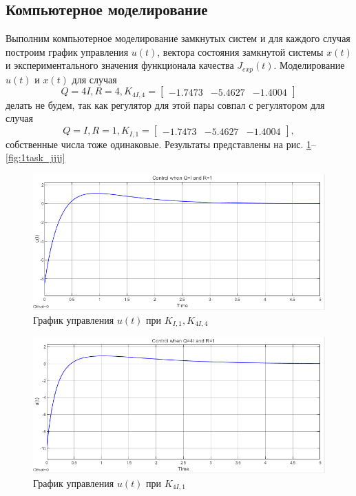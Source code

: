 \documentclass[a4paper, 12pt]{article}
\begin{document}
    \subsection{Компьютерное моделирование}
    Выполним компьютерное моделирование замкнутых систем и для каждого случая построим
    график управления $u(t)$, вектора состояния замкнутой системы $x(t)$
    и экспериментального значения функционала качества $J_{exp}(t)$. Моделирование
    $u(t)$ и $x(t)$ для случая $$Q=4I,R=4,K_{4I,4}=\begin{bmatrix}
        -1.7473 &-5.4627 &-1.4004
    \end{bmatrix}$$ делать не будем, так как регулятор для
    этой пары совпал с регулятором для случая $$Q=I,R=1,K_{I,1}=\begin{bmatrix}
        -1.7473 &-5.4627 &-1.4004
    \end{bmatrix},$$ собственные числа тоже одинаковые. Результаты представлены на
    рис. \ref{fig:1task_u}--\ref{fig:1task_jjjj}
    \begin{figure}[H]
        \centering
        \includegraphics[scale=0.75]{1task_u.png}
        \captionsetup{skip=0pt}
        \caption{График управления $u(t)$ при $K_{I,1},K_{4I,4}$}
        \label{fig:1task_u}
    \end{figure}
    \begin{figure}[H]
        \centering
        \includegraphics[scale=0.75]{1task_uu.png}
        \captionsetup{skip=0pt}
        \caption{График управления $u(t)$ при $K_{4I,1}$}
        \label{fig:1task_uu}
    \end{figure}
\end{document}
